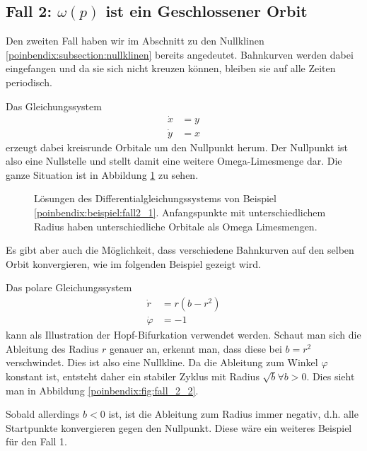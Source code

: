 \subsection{Fall 2: $\omega(p)$ ist ein Geschlossener Orbit} \label{poinbendix:subsection:fall2}

Den zweiten Fall haben wir im Abschnitt zu den Nullklinen \ref{poinbendix:subsection:nullklinen} bereits angedeutet.
Bahnkurven werden dabei eingefangen und da sie sich nicht kreuzen können, bleiben sie auf alle Zeiten periodisch.

\begin{beispiel} \label{poinbendix:beispiel:fall2_1}
Das Gleichungssystem
\begin{align*}
    \dot{x} &= y \\
    \dot{y} &= x
\end{align*}
erzeugt dabei kreisrunde Orbitale um den Nullpunkt herum.
Der Nullpunkt ist also eine Nullstelle und stellt damit eine weitere Omega-Limesmenge dar.
Die ganze Situation ist in Abbildung \ref{poinbendix:fig:fall_2} zu sehen.
\end{beispiel}

\begin{figure}
\centering
    
    \caption{Lösungen des Differentialgleichungssystems von Beispiel \ref{poinbendix:beispiel:fall2_1}.
    Anfangspunkte mit unterschiedlichem Radius haben unterschiedliche Orbitale als Omega Limesmengen.}
\label{poinbendix:fig:fall_2}
\end{figure}

Es gibt aber auch die Möglichkeit, dass verschiedene Bahnkurven auf den selben Orbit konvergieren, wie im folgenden Beispiel gezeigt wird.

\begin{beispiel} \label{poinbendix:beispiel:fall2_2}
Das polare Gleichungssystem
\begin{align*}
    \dot{r}       &= r(b-r^2) \\
    \dot{\varphi} &= -1
\end{align*}
kann als Illustration der Hopf-Bifurkation verwendet werden.
Schaut man sich die Ableitung des Radius $r$ genauer an, erkennt man, dass diese bei $b = r^2$ verschwindet.
Dies ist also eine Nullkline.
Da die Ableitung zum Winkel $\varphi$ konstant ist, entsteht daher ein stabiler Zyklus mit Radius $\sqrt{b} \forall b > 0$.
Dies sieht man in Abbildung \ref{poinbendix:fig:fall_2_2}.

Sobald allerdings $b < 0$ ist, ist die Ableitung zum Radius immer negativ, d.h. alle Startpunkte konvergieren gegen den Nullpunkt.
Diese wäre ein weiteres Beispiel für den Fall 1.
\end{beispiel}


